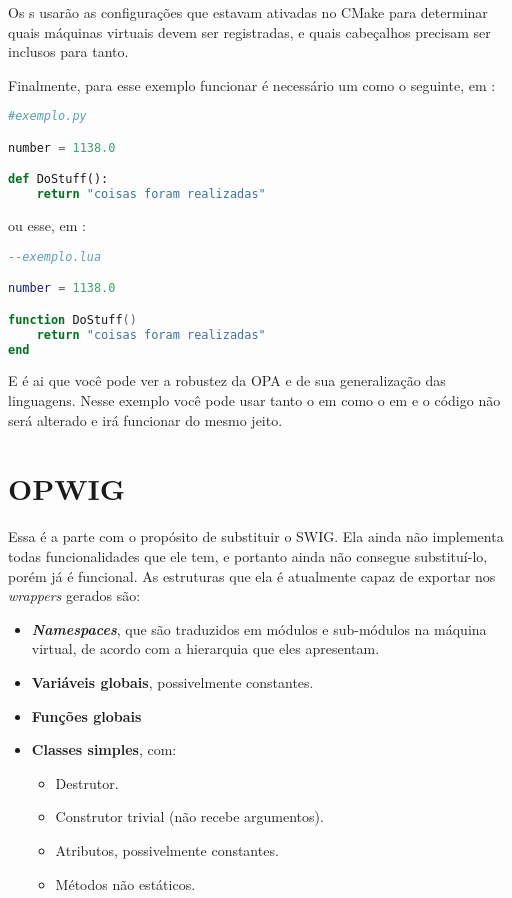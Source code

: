 Os s usarão as configurações que estavam ativadas no CMake para
determinar quais máquinas virtuais devem ser registradas, e quais cabeçalhos
precisam ser inclusos para tanto.

Finalmente, para esse exemplo funcionar é necessário um \script{} como o seguinte,
em :

\begin{lstlisting}[language=python]
#exemplo.py

number = 1138.0

def DoStuff():
    return "coisas foram realizadas"
\end{lstlisting}

ou esse, em :

\begin{lstlisting}[language=lua]
--exemplo.lua

number = 1138.0

function DoStuff()
    return "coisas foram realizadas"
end
\end{lstlisting}

E é ai que você pode ver a robustez da OPA e de sua generalização das linguagens.
Nesse exemplo você pode usar tanto o \script{} em  como o \script{} em
 e o código \CXX{} não será alterado e irá funcionar do mesmo jeito.

\section{OPWIG}
\label{cap:resultados:opwig}

Essa é a parte com o propósito de substituir o SWIG.
Ela ainda não implementa todas funcionalidades que ele tem, e portanto
ainda não consegue substituí-lo, porém já é funcional.
As estruturas \CXX{} que ela é atualmente capaz de exportar nos \textit{wrappers}
gerados são:

\begin{itemize}
  \item \textbf{\textit{Namespaces}}, que são traduzidos em módulos e sub-módulos
        na máquina virtual, de acordo com a hierarquia que eles apresentam.
  \item \textbf{Variáveis globais}, possivelmente constantes.
  \item \textbf{Funções globais}
  \item \textbf{Classes simples}, com:
    \begin{itemize}
      \item Destrutor.
      \item Construtor trivial (não recebe argumentos).
      \item Atributos, possivelmente constantes.
      \item Métodos não estáticos.
    \end{itemize}
\end{itemize}

